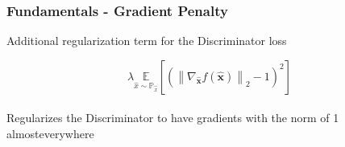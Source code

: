 \begin{frame}
    \frametitle{Fundamentals - Gradient Penalty}

    \begin{center}
        Additional regularization term for the Discriminator loss
        
        \begin{equation}
            \lambda \underset{\hat{x} \sim \mathbb{P}_{\hat{x}}}{\mathbb{E}}\left[\left(\left\|\nabla_{\hat{\boldsymbol{x}}} f(\hat{\boldsymbol{x}})\right\|_{2}-1\right)^{2}\right]
        \end{equation}\\
        
        Regularizes the Discriminator to have gradients with the norm of 1 almosteverywhere
    \end{center}
\end{frame}
